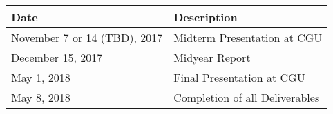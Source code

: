 \begin{center}
\begin{tabular}{@{}ll@{}}
\toprule
 \textbf{Date} & \textbf{Description} \\ \midrule
 November 7 or 14 (TBD), 2017 & Midterm Presentation at CGU  \\ 
December 15, 2017 & Midyear Report  \\
 May 1, 2018 & Final Presentation at CGU  \\
 May 8, 2018 & Completion of all Deliverables  \\ \bottomrule
\end{tabular}
\end{center}